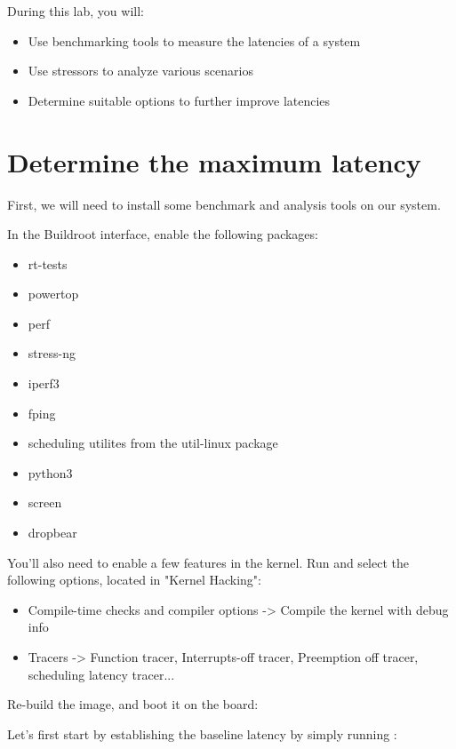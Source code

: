 
During this lab, you will:
\begin{itemize}
  \item Use benchmarking tools to measure the latencies of a system
  \item Use stressors to analyze various scenarios
  \item Determine suitable options to further improve latencies
\end{itemize}

\section{Determine the maximum latency}

First, we will need to install some benchmark and analysis tools on our system.

In the Buildroot  interface, enable the following packages:

\begin{itemize}
	\item rt-tests
	\item powertop
	\item perf
	\item stress-ng
	\item iperf3
	\item fping
	\item scheduling utilites from the util-linux package
	\item python3
	\item screen
	\item dropbear
\end{itemize}

You'll also need to enable a few features in the kernel. Run  and select
the following options, located in "Kernel Hacking":

\begin{itemize}
	\item Compile-time checks and compiler options -> Compile the kernel with debug info
	\item Tracers -> Function tracer, Interrupts-off tracer, Preemption off tracer, scheduling latency tracer...
\end{itemize}

Re-build the image, and boot it on the board: 

Let's first start by establishing the baseline latency by simply running :

